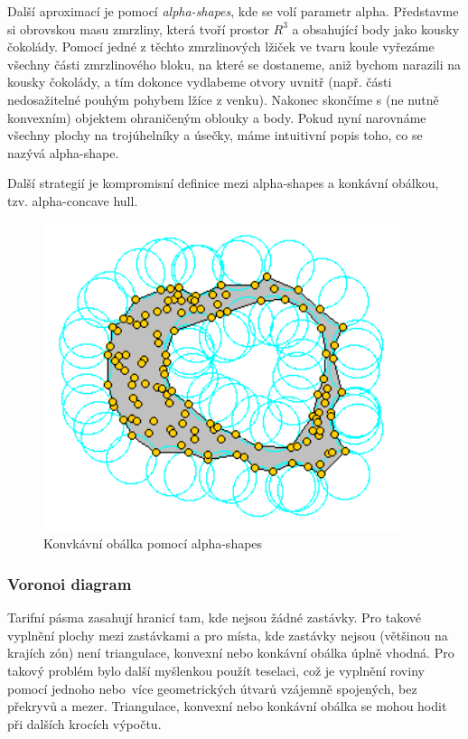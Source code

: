 Další aproximací je pomocí \textit{alpha-shapes}, kde se volí parametr alpha. Představme si obrovskou masu zmrzliny,
která tvoří prostor \(R^3\) a obsahující body jako  kousky čokolády. Pomocí jedné z těchto 
zmrzlinových lžiček ve tvaru koule vyřezáme všechny části zmrzlinového bloku, na které se dostaneme,
aniž bychom narazili na kousky čokolády, a tím dokonce vydlabeme otvory uvnitř 
(např. části nedosažitelné pouhým pohybem lžíce z venku). Nakonec skončíme s 
(ne nutně konvexním) objektem ohraničeným oblouky a body. Pokud nyní narovnáme všechny 
 plochy na trojúhelníky a úsečky, máme intuitivní popis toho, co se nazývá alpha-shape. \cite{alpha-shapes}

Další strategií je kompromisní definice mezi alpha-shapes a konkávní obálkou, tzv. alpha-concave
hull. 

\begin{figure}[H] \centering
    \includegraphics[width=296pt]{./pictures/alphashape.png}
    \caption[Konvkávní obálka pomocí alpha-shapes]{Konvkávní obálka pomocí alpha-shapes \cite{alpha-shapes-picture}}
	\label{fig:alpha-shapes-picture}              
\end{figure} 

\subsubsection{Voronoi diagram}

Tarifní pásma zasahují hranicí tam, kde nejsou žádné zastávky. Pro takové vyplnění plochy
mezi zastávkami a pro místa, kde zastávky nejsou (většinou na krajích zón) není triangulace, konvexní nebo konkávní 
obálka úplně vhodná. Pro takový problém bylo další myšlenkou použít teselaci, což je vyplnění roviny pomocí jednoho
nebo~více geometrických útvarů vzájemně spojených, bez překryvů a mezer. Triangulace, konvexní nebo konkávní 
obálka se mohou hodit při dalších krocích výpočtu.

